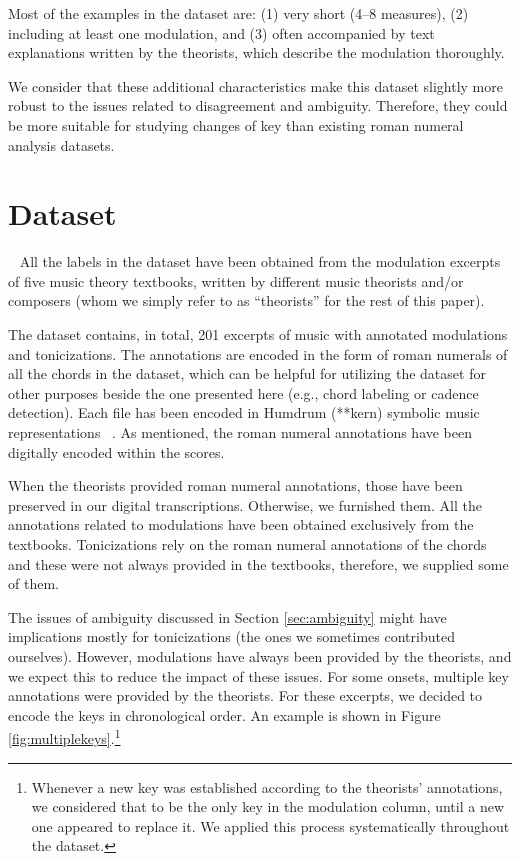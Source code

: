 \documentclass[sigconf]{acmart}
\begin{document}
Most of the examples in the dataset are: (1) very short (4--8 measures), (2) including at least one modulation, and (3) often accompanied by text explanations written by the theorists, which describe the modulation thoroughly.

We consider that these additional characteristics make this dataset slightly more robust to the issues related to disagreement and ambiguity. 
Therefore, they could be more suitable for studying changes of key than existing roman numeral analysis datasets.



\section{Dataset}~\label{sec:dataset}
All the labels in the dataset have been obtained from the modulation excerpts of five music theory textbooks, written by different music theorists and/or composers (whom we simply refer to as ``theorists'' for the rest of this paper).

The dataset contains, in total, 201 excerpts of music with annotated modulations and tonicizations. 
The annotations are encoded in the form of roman numerals of all the chords in the dataset, which can be helpful for utilizing the dataset for other purposes beside the one presented here (e.g., chord labeling or cadence detection).
Each file has been encoded in Humdrum (**kern) symbolic music representations ~\cite{Huron02:humdrum}. 
As mentioned, the roman numeral annotations have been digitally encoded \cite{napoleslopez20harmalysis} within the scores.

When the theorists provided roman numeral annotations, those have been preserved in our digital transcriptions. 
Otherwise, we furnished them. All the annotations related to modulations have been obtained exclusively from the textbooks. 
Tonicizations rely on the roman numeral annotations of the chords and these were not always provided in the textbooks, therefore, we supplied some of them.

The issues of ambiguity discussed in Section \ref{sec:ambiguity} might have implications mostly for tonicizations (the ones we sometimes contributed ourselves).
However, modulations have always been provided by the theorists, and we expect this to reduce the impact of these issues. 
For some onsets, multiple key annotations were provided by the theorists. For these excerpts, we decided to encode the keys in chronological order. 
An example is shown in Figure \ref{fig:multiplekeys}.\footnote{Whenever a new key was established according to the theorists' annotations, we considered that to be the only key in the modulation column, until a new one appeared to replace it. 
We applied this process systematically throughout the dataset. %
}
\end{document}
